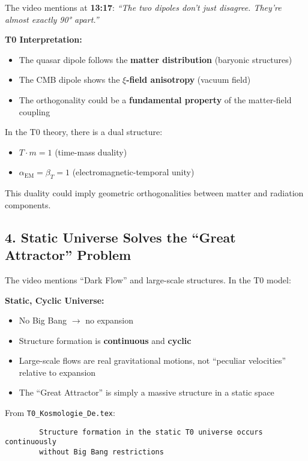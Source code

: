 \documentclass{article}
\begin{document}
	The video mentions at \textbf{13:17}: \textit{``The two dipoles don't just disagree. They're almost exactly 90° apart.''} \cite{secrest2024}
	
	\textbf{T0 Interpretation:}
	\begin{itemize}
		\item The quasar dipole follows the \textbf{matter distribution} (baryonic structures)
		\item The CMB dipole shows the \textbf{$\xi$-field anisotropy} (vacuum field)
		\item The orthogonality could be a \textbf{fundamental property} of the matter-field coupling
	\end{itemize}
	
	In the T0 theory, there is a dual structure:
	\begin{itemize}
		\item $T \cdot m = 1$ (time-mass duality)
		\item $\alpha_{\text{EM}} = \beta_T = 1$ (electromagnetic-temporal unity)
	\end{itemize}
	
	This duality could imply geometric orthogonalities between matter and radiation components.
	
	\subsection{4. Static Universe Solves the ``Great Attractor'' Problem}
	
	The video mentions ``Dark Flow'' and large-scale structures. In the T0 model:
	
	\textbf{Static, Cyclic Universe:}
	\begin{itemize}
		\item No Big Bang $\rightarrow$ no expansion
		\item Structure formation is \textbf{continuous} and \textbf{cyclic}
		\item Large-scale flows are real gravitational motions, not ``peculiar velocities'' relative to expansion
		\item The ``Great Attractor'' is simply a massive structure in a static space
	\end{itemize}
	
	From \texttt{T0\_Kosmologie\_De.tex}:
	\begin{verbatim}
		Structure formation in the static T0 universe occurs continuously 
		without Big Bang restrictions
	\end{verbatim}
	
\end{document}
